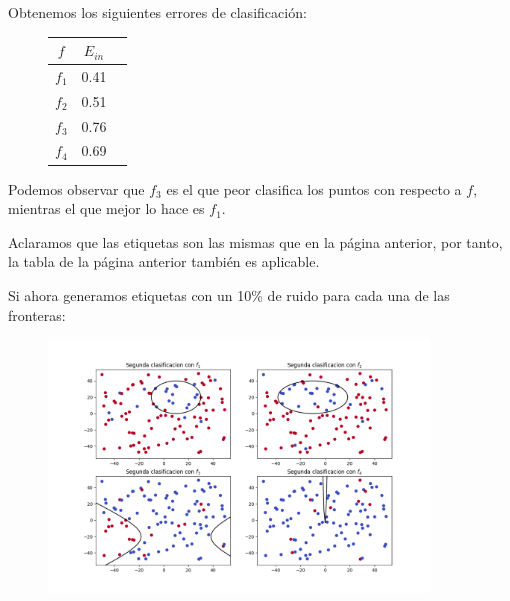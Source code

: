 \documentclass{article}
\begin{document}
    Obtenemos los siguientes errores de clasificación:

    \begin{figure}[h]
    \centering
    \begin{tabular}{ |c|c|c| }
        \hline
        $f$   & $E_{in}$   \\
        \hline
        $f_1$ & 0.41       \\
        \hline
        $f_2$ & 0.51       \\
        \hline
        $f_3$ & 0.76       \\
        \hline
        $f_4$ & 0.69       \\
        \hline
    \end{tabular}
    \end{figure}

    Podemos observar que $f_3$ es el que peor clasifica los puntos con respecto a $f$, mientras
    el que mejor lo hace es $f_1$.

    Aclaramos que las etiquetas son las mismas que en
    la página anterior, por tanto, la tabla de la página anterior también es aplicable.

    \pagebreak

    Si ahora generamos etiquetas con un 10\% de ruido para cada una de las fronteras:

    \begin{figure}[h]
        \centering
        \includegraphics[width=0.9\textwidth]{fallruido.png}
    \end{figure}
\end{document}
